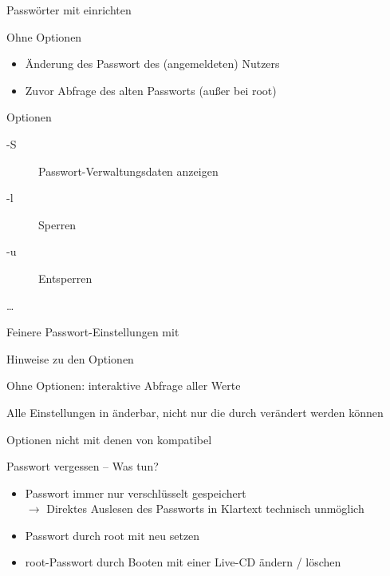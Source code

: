 \documentclass[aspectratio=43]{beamer}
\begin{document}
\begin{frame}{Passwörter mit  einrichten}
  \begin{center}
    \colorbox{yellow}{}
  \end{center}
  \begin{block}{Ohne Optionen}
    \begin{itemize}
      \item Änderung des Passwort des (angemeldeten) Nutzers
      \item Zuvor Abfrage des alten Passworts (außer bei root)
    \end{itemize}
  \end{block}
  \begin{block}{Optionen}
    \begin{description}
      \item[-S] Passwort-Verwaltungsdaten anzeigen
      \item[-l] Sperren
      \item[-u] Entsperren
      \item[\dots]
    \end{description}
  \end{block}
\end{frame}
\begin{frame}{Feinere Passwort-Einstellungen mit }
  \begin{center}
    \colorbox{yellow}{}
  \end{center}
  \begin{block}{Hinweise zu den Optionen}
    \begin{itemize}
      \item Ohne Optionen: interaktive Abfrage aller Werte
      \item Alle Einstellungen in  änderbar, nicht nur die durch  verändert werden können
      {\color{gray} \item Optionen nicht mit denen von  kompatibel}
    \end{itemize}
  \end{block}
\end{frame}

\begin{frame}{Passwort vergessen -- Was tun?}
    \begin{itemize}
      \item Passwort immer nur verschlüsselt gespeichert \\
      $\rightarrow$ Direktes Auslesen des Passworts in Klartext technisch unmöglich
      \item Passwort durch root mit  neu setzen
      \item root-Passwort durch Booten mit einer Live-CD ändern / löschen
    \end{itemize}
\end{frame}
\end{document}
